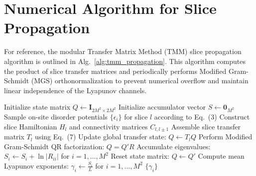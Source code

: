 \section{Numerical Algorithm for Slice Propagation}
\label{sec:appendix_algorithm}

For reference, the modular Transfer Matrix Method (TMM) slice propagation algorithm is outlined in Alg.~\ref{alg:tmm_propagation}. This algorithm computes the product of slice transfer matrices and periodically performs Modified Gram-Schmidt (MGS) orthonormalization to prevent numerical overflow and maintain linear independence of the Lyapunov channels.

\begin{algorithm}[H]
\caption{Transfer Matrix Method Slice Propagation with Reorthogonalization}
\label{alg:tmm_propagation}
\begin{algorithmic}[1]
\State Initialize state matrix $Q \leftarrow \mathbf{I}_{2M^2 \times 2M^2}$
\State Initialize accumulator vector $S \leftarrow \mathbf{0}_{M^2}$
    \State Sample on-site disorder potentials $\{\epsilon_i\}$ for slice $l$ according to Eq.~(3)
    \State Construct slice Hamiltonian $H_l$ and connectivity matrices $C_{l, l\pm1}$
    \State Assemble slice transfer matrix $T_l$ using Eq.~(7)
    \State Update global transfer state: $Q \leftarrow T_l Q$
        \State Perform Modified Gram-Schmidt QR factorization: $Q = Q' R$
        \State Accumulate eigenvalues: $S_i \leftarrow S_i + \ln |R_{ii}|$ for $i = 1, \dots, M^2$
        \State Reset state matrix: $Q \leftarrow Q'$
    \EndIf
\EndFor
\State Compute mean Lyapunov exponents: $\gamma_i \leftarrow \frac{S_i}{L}$ for $i = 1, \dots, M^2$
\State \Return $\{\gamma_i\}$
\end{algorithmic}
\end{algorithm}
